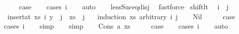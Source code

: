 \begin{isabellebody}
\ \ \isamarkupfalse%
\ \isamarkupfalse%
\ {\isacharquery}{\kern0pt}case\isanewline
\ \ \isamarkupfalse%
\ {\isacharparenleft}{\kern0pt}cases\ i{\isacharparenright}{\kern0pt}\isanewline
\ \ \isamarkupfalse%
\ auto\isanewline
\ \ \isamarkupfalse%
\ less{\isacharunderscore}{\kern0pt}Suc{\isacharunderscore}{\kern0pt}eq{\isacharunderscore}{\kern0pt}{}{\isacharunderscore}{\kern0pt}disj\ \isamarkupfalse%
\ fastforce\isanewline
{}\isamarkupfalse%
%
\endisatagproof
{\isafoldproof}%
%
\isadelimproof
\isanewline
%
\endisadelimproof
\isanewline
\isanewline
\isanewline
{}\isamarkupfalse%
\ shift{\isacharunderscore}{\kern0pt}lt{\isacharcolon}{\kern0pt}\isanewline
\ \ {\isachardoublequoteopen}i\ {\isacharless}{\kern0pt}\ j\ {\isacharequal}{\kern0pt}{\isacharequal}{\kern0pt}{\isachargreater}{\kern0pt}\isanewline
\ \ {\isacharparenleft}{\kern0pt}insert{\isacharunderscore}{\kern0pt}at\ xs\ i\ y{\isacharparenright}{\kern0pt}\ {\isacharbang}{\kern0pt}\ j\ {\isacharequal}{\kern0pt}\ xs\ {\isacharbang}{\kern0pt}\ {\isacharparenleft}{\kern0pt}j\ {\isacharminus}{\kern0pt}\ {}{\isacharparenright}{\kern0pt}{\isachardoublequoteclose}\isanewline
%
\isadelimproof
%
\endisadelimproof
%
\isatagproof
{}\isamarkupfalse%
\ {\isacharparenleft}{\kern0pt}induction\ xs\ arbitrary{\isacharcolon}{\kern0pt}\ i\ j{\isacharparenright}{\kern0pt}\isanewline
\ \ \isamarkupfalse%
\ Nil\isanewline
\ \ \isamarkupfalse%
\ \isamarkupfalse%
\ {\isacharquery}{\kern0pt}case\isanewline
\ \ \isamarkupfalse%
\ {\isacharparenleft}{\kern0pt}cases\ i{\isacharparenright}{\kern0pt}\isanewline
\ \ \isamarkupfalse%
\ simp\isanewline
\ \ \isamarkupfalse%
\ simp\isanewline
{}\isamarkupfalse%
\isanewline
\ \ \isamarkupfalse%
\ {\isacharparenleft}{\kern0pt}Cons\ a\ xs{\isacharparenright}{\kern0pt}\isanewline
\ \ \isamarkupfalse%
\ \isamarkupfalse%
\ {\isacharquery}{\kern0pt}case\isanewline
\ \ \isamarkupfalse%
\ {\isacharparenleft}{\kern0pt}cases\ i{\isacharparenright}{\kern0pt}\isanewline
\ \ \isamarkupfalse%
\ auto\isanewline
\ \ \isamarkupfalse%
\isanewline
{}\isamarkupfalse%
%
\endisatagproof
{\isafoldproof}%
%
\isadelimproof
%
\endisadelimproof

\end{isabellebody}

